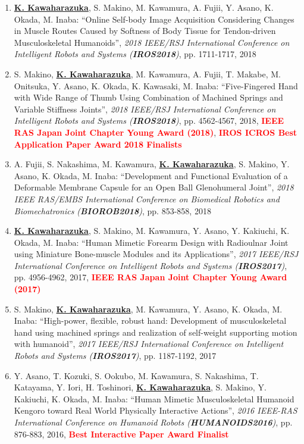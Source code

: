 \documentclass[letterpaper,11pt]{article}
\begin{document}
\begin{enumerate}
\item \underline{\textbf{K. Kawaharazuka}}, S. Makino, M. Kawamura, A. Fujii, Y. Asano, K. Okada, M. Inaba: ``Online Self-body Image Acquisition Considering Changes in Muscle Routes Caused by Softness of Body Tissue for Tendon-driven Musculoskeletal Humanoids'', \textit{2018 IEEE/RSJ International Conference on Intelligent Robots and Systems (\textit{\textbf{IROS2018}})}, pp. 1711-1717, 2018
\item S. Makino, \underline{\textbf{K. Kawaharazuka}}, M. Kawamura, A. Fujii, T. Makabe, M. Onitsuka, Y. Asano, K. Okada, K. Kawasaki, M. Inaba: ``Five-Fingered Hand with Wide Range of Thumb Using Combination of Machined Springs and Variable Stiffness Joints'', \textit{2018 IEEE/RSJ International Conference on Intelligent Robots and Systems (\textit{\textbf{IROS2018}})}, pp. 4562-4567, 2018, \textbf{\textcolor{red}{IEEE RAS Japan Joint Chapter Young Award (2018)}}, \textbf{\textcolor{red}{IROS ICROS Best Application Paper Award 2018 Finalists}}
\item A. Fujii, S. Nakashima, M. Kawamura, \underline{\textbf{K. Kawaharazuka}}, S. Makino, Y. Asano, K. Okada, M. Inaba: ``Development and Functional Evaluation of a Deformable Membrane Capsule for an Open Ball Glenohumeral Joint'', \textit{2018 IEEE RAS/EMBS International Conference on Biomedical Robotics and Biomechatronics (\textit{\textbf{BIOROB2018}})}, pp. 853-858, 2018
\item \underline{\textbf{K. Kawaharazuka}}, S. Makino, M. Kawamura, Y. Asano, Y. Kakiuchi, K. Okada, M. Inaba: ``Human Mimetic Forearm Design with Radioulnar Joint using Miniature Bone-muscle Modules and its Applications'', \textit{2017 IEEE/RSJ International Conference on Intelligent Robots and Systems (\textit{\textbf{IROS2017}})}, pp. 4956-4962, 2017, \textbf{\textcolor{red}{IEEE RAS Japan Joint Chapter Young Award (2017)}}
\item S. Makino, \underline{\textbf{K. Kawaharazuka}}, M. Kawamura, Y. Asano, K. Okada, M. Inaba: ``High-power, flexible, robust hand: Development of musculoskeletal hand using machined springs and realization of self-weight supporting motion with humanoid'', \textit{2017 IEEE/RSJ International Conference on Intelligent Robots and Systems (\textit{\textbf{IROS2017}})}, pp. 1187-1192, 2017
\item Y. Asano, T. Kozuki, S. Ookubo, M. Kawamura, S. Nakashima, T. Katayama, Y. Iori, H. Toshinori, \underline{\textbf{K. Kawaharazuka}}, S. Makino, Y. Kakiuchi, K. Okada, M. Inaba: ``Human Mimetic Musculoskeletal Humanoid Kengoro toward Real World Physically Interactive Actions'', \textit{2016 IEEE-RAS International Conference on Humanoid Robots (\textit{\textbf{HUMANOIDS2016}})}, pp. 876-883, 2016, \textbf{\textcolor{red}{Best Interactive Paper Award Finalist}}
\end{enumerate}
\end{document}
